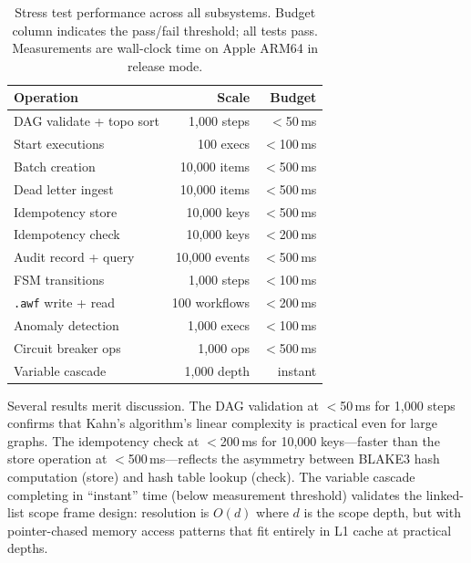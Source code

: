 \documentclass[10pt, twocolumn]{article}
\begin{document}
\begin{table}[t]
\caption{Stress test performance across all subsystems. Budget column indicates the pass/fail threshold; all tests pass. Measurements are wall-clock time on Apple ARM64 in release mode.}
\label{tab:perf}
\centering\scriptsize
\begin{tabular}{@{}lrr@{}}
\toprule
\textbf{Operation} & \textbf{Scale} & \textbf{Budget} \\
\midrule
DAG validate + topo sort    & 1{,}000 steps  & $<$50\,ms \\
Start executions            & 100 execs      & $<$100\,ms \\
Batch creation              & 10{,}000 items & $<$500\,ms \\
Dead letter ingest          & 10{,}000 items & $<$500\,ms \\
Idempotency store           & 10{,}000 keys  & $<$500\,ms \\
Idempotency check           & 10{,}000 keys  & $<$200\,ms \\
Audit record + query        & 10{,}000 events& $<$500\,ms \\
FSM transitions             & 1{,}000 steps  & $<$100\,ms \\
\texttt{.awf} write + read  & 100 workflows  & $<$200\,ms \\
Anomaly detection           & 1{,}000 execs  & $<$100\,ms \\
Circuit breaker ops         & 1{,}000 ops    & $<$500\,ms \\
Variable cascade            & 1{,}000 depth  & instant \\
\bottomrule
\end{tabular}
\end{table}

Several results merit discussion. The DAG validation at $<$50\,ms for 1{,}000 steps confirms that Kahn's algorithm's linear complexity is practical even for large graphs. The idempotency check at $<$200\,ms for 10{,}000 keys---faster than the store operation at $<$500\,ms---reflects the asymmetry between BLAKE3 hash computation (store) and hash table lookup (check). The variable cascade completing in ``instant'' time (below measurement threshold) validates the linked-list scope frame design: resolution is $O(d)$ where $d$ is the scope depth, but with pointer-chased memory access patterns that fit entirely in L1 cache at practical depths.
\end{document}
